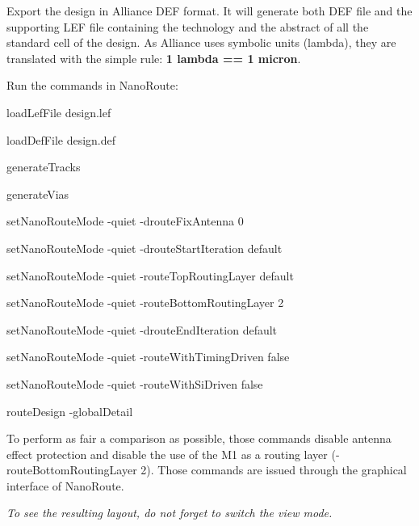 \begin{DoxyItemize}
\item Export the design in Alliance {\ttfamily D\+EF} format. It will generate both {\ttfamily D\+EF} file and the supporting {\ttfamily L\+EF} file containing the technology and the abstract of all the standard cell of the design. As Alliance uses symbolic units (lambda), they are translated with the simple rule\+: {\bfseries 1 lambda == 1 micron}.
\item Run the commands in Nano\+Route\+:
\begin{DoxyItemize}
\item {\ttfamily load\+Lef\+File design.\+lef}
\item {\ttfamily load\+Def\+File design.\+def}
\item {\ttfamily generate\+Tracks}
\item {\ttfamily generate\+Vias}
\item {\ttfamily set\+Nano\+Route\+Mode -\/quiet -\/droute\+Fix\+Antenna 0}
\item {\ttfamily set\+Nano\+Route\+Mode -\/quiet -\/droute\+Start\+Iteration default}
\item {\ttfamily set\+Nano\+Route\+Mode -\/quiet -\/route\+Top\+Routing\+Layer default}
\item {\ttfamily set\+Nano\+Route\+Mode -\/quiet -\/route\+Bottom\+Routing\+Layer 2}
\item {\ttfamily set\+Nano\+Route\+Mode -\/quiet -\/droute\+End\+Iteration default}
\item {\ttfamily set\+Nano\+Route\+Mode -\/quiet -\/route\+With\+Timing\+Driven false}
\item {\ttfamily set\+Nano\+Route\+Mode -\/quiet -\/route\+With\+Si\+Driven false}
\item {\ttfamily route\+Design -\/global\+Detail}
\end{DoxyItemize}
\item To perform as fair a comparison as possible, those commands disable antenna effect protection and disable the use of the {\ttfamily M1} as a routing layer ({\ttfamily -\/route\+Bottom\+Routing\+Layer 2}). Those commands are issued through the graphical interface of Nano\+Route.
\end{DoxyItemize}

{\itshape To see the resulting layout, do not forget to switch the view mode.} 
